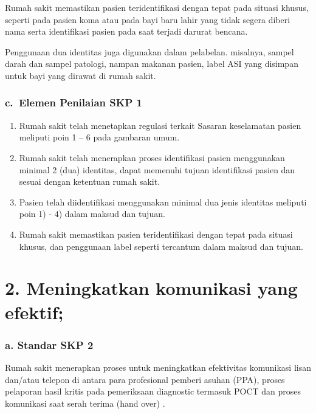 \documentclass[
]{book}
\providecommand{\tightlist}{%
  \setlength{\itemsep}{0pt}\setlength{\parskip}{0pt}}
\begin{document}
Rumah sakit memastikan pasien teridentifikasi dengan tepat pada situasi khusus, seperti pada pasien koma atau pada bayi baru lahir yang tidak segera diberi nama serta identifikasi pasien pada saat terjadi darurat bencana.

Penggunaan dua identitas juga digunakan dalam pelabelan. misalnya, sampel darah dan sampel patologi, nampan makanan pasien, label ASI yang disimpan untuk bayi yang dirawat di rumah sakit.

\hypertarget{c.-elemen-penilaian-skp-1}{%
\subsubsection*{c.~Elemen Penilaian SKP 1}\label{c.-elemen-penilaian-skp-1}}

\begin{enumerate}
\def\labelenumi{\arabic{enumi}.}
\tightlist
\item
  Rumah sakit telah menetapkan regulasi terkait Sasaran keselamatan pasien meliputi poin 1 -- 6 pada gambaran umum.
\item
  Rumah sakit telah menerapkan proses identifikasi pasien menggunakan minimal 2 (dua) identitas, dapat memenuhi tujuan identifikasi pasien dan sesuai dengan ketentuan rumah sakit.
\item
  Pasien telah diidentifikasi menggunakan minimal dua jenis identitas meliputi poin 1) - 4) dalam maksud dan tujuan.
\item
  Rumah sakit memastikan pasien teridentifikasi dengan tepat pada situasi khusus, dan penggunaan label seperti tercantum dalam maksud dan tujuan.
\end{enumerate}

\hypertarget{meningkatkan-komunikasi-yang-efektif}{%
\section*{2. Meningkatkan komunikasi yang efektif;}\label{meningkatkan-komunikasi-yang-efektif}}

\hypertarget{a.-standar-skp-2}{%
\subsubsection*{a. Standar SKP 2}\label{a.-standar-skp-2}}

Rumah sakit menerapkan proses untuk meningkatkan efektivitas komunikasi lisan dan/atau telepon di antara para profesional pemberi asuhan (PPA), proses pelaporan hasil kritis pada pemeriksaan diagnostic termasuk POCT dan proses komunikasi saat serah terima (hand over) .
\end{document}
